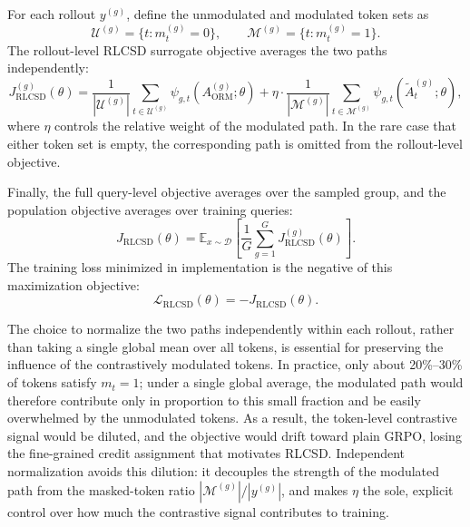 For each rollout $y^{(g)}$, define the unmodulated and modulated token
sets as
\begin{equation}
\mathcal{U}^{(g)} = \{t : m^{(g)}_t = 0\},
\qquad
\mathcal{M}^{(g)} = \{t : m^{(g)}_t = 1\}.
\end{equation}
The rollout-level RLCSD surrogate objective averages the two paths
independently:
\begin{equation}
\label{eq:rlcsd-rollout-obj}
J_{\text{RLCSD}}^{(g)}(\theta)
=
\frac{1}{|\mathcal{U}^{(g)}|}
\sum_{t \in \mathcal{U}^{(g)}}
\psi_{g,t}\!\left(A_{\text{ORM}}^{(g)}; \theta\right)
+
\eta \cdot
\frac{1}{|\mathcal{M}^{(g)}|}
\sum_{t \in \mathcal{M}^{(g)}}
\psi_{g,t}\!\left(\tilde{A}^{(g)}_t; \theta\right),
\end{equation}
where $\eta$ controls the relative weight of the modulated path.
In the rare case that either token set is empty, the corresponding
path is omitted from the rollout-level objective.

Finally, the full query-level objective averages over the sampled group,
and the population objective averages over training queries:
\begin{equation}
\label{eq:rlcsd-full-obj}
J_{\text{RLCSD}}(\theta)
=
\mathbb{E}_{x \sim \mathcal{D}}
\left[
\frac{1}{G}
\sum_{g=1}^{G}
J_{\text{RLCSD}}^{(g)}(\theta)
\right].
\end{equation}
The training loss minimized in implementation is the negative of this
maximization objective:
\begin{equation}
\label{eq:rlcsd-loss}
\mathcal{L}_{\text{RLCSD}}(\theta)
=
- J_{\text{RLCSD}}(\theta).
\end{equation}

The choice to normalize the two paths independently within each rollout, rather than taking a single global mean over all tokens, is essential for preserving the influence of the contrastively modulated tokens. In practice, only about 20\%--30\% of tokens satisfy $m_t=1$; under a single global average, the modulated path would therefore contribute only in proportion to this small fraction and be easily overwhelmed by the unmodulated tokens. As a result, the token-level contrastive signal would be diluted, and the objective would drift toward plain GRPO, losing the fine-grained credit assignment that motivates RLCSD. Independent normalization avoids this dilution: it decouples the strength of the modulated path from the masked-token ratio $|\mathcal{M}^{(g)}|/|y^{(g)}|$, and makes $\eta$ the sole, explicit control over how much the contrastive signal contributes to training.

